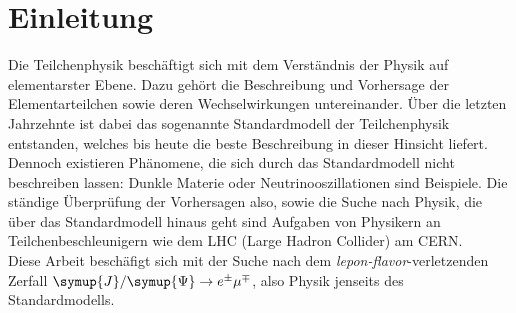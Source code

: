 \chapter{Einleitung}

Die Teilchenphysik beschäftigt sich mit dem Verständnis der Physik auf elementarster Ebene. Dazu gehört die Beschreibung und Vorhersage der Elementarteilchen sowie deren Wechselwirkungen untereinander. Über die letzten Jahrzehnte ist dabei das sogenannte Standardmodell der Teilchenphysik entstanden, welches bis heute die beste Beschreibung in dieser Hinsicht liefert. Dennoch existieren Phänomene, die sich durch das Standardmodell nicht beschreiben lassen: Dunkle Materie oder Neutrinooszillationen sind Beispiele. Die ständige Überprüfung der Vorhersagen also, sowie die Suche nach Physik, die über das Standardmodell hinaus geht sind Aufgaben von Physikern an Teilchenbeschleunigern wie dem LHC (Large Hadron Collider) am CERN. \\
Diese Arbeit beschäfigt sich mit der Suche nach dem \textit{lepon-flavor}-verletzenden Zerfall $\symup{J}/\symup{\Psi}\rightarrow e^{\pm}\mu^{\mp}$, also Physik jenseits des Standardmodells.
